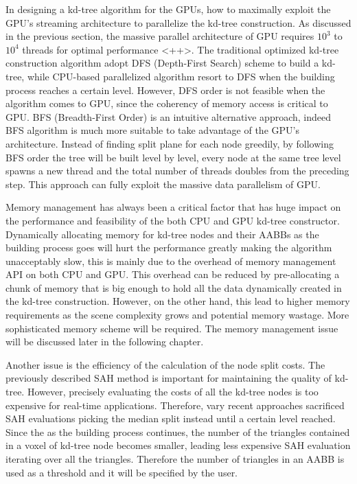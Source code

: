 In designing a kd-tree algorithm for the GPUs, how to maximally exploit the GPU's streaming architecture to parallelize the kd-tree construction. As discussed in the previous section, the massive parallel architecture of GPU requires \(10^{3}\) to \(10^{4}\) threads for optimal performance \cite{}<++>. The traditional optimized kd-tree construction algorithm adopt DFS (Depth-First Search) scheme to build a kd-tree, while CPU-based parallelized algorithm resort to DFS when the building process reaches a certain level. However, DFS order is not feasible when the algorithm comes to GPU, since the coherency of memory access is critical to GPU. BFS (Breadth-First Order) is an intuitive alternative approach, indeed BFS algorithm is much more suitable to take advantage of the GPU's architecture. Instead of finding split plane for each node greedily, by following BFS order the tree will be built level by level, every node at the same tree level spawns a new thread and the total number of threads doubles from the preceding step. This approach can fully exploit the massive data parallelism of GPU.

Memory management has always been a critical factor that has huge impact on the performance and feasibility of the both CPU and GPU kd-tree constructor. Dynamically allocating memory for kd-tree nodes and their AABBs as the building process goes will hurt the performance greatly making the algorithm unacceptably slow, this is mainly due to the overhead of memory management API on both CPU and GPU. This overhead can be reduced by pre-allocating a chunk of memory that is big enough to hold all the data dynamically created in the kd-tree construction. However, on the other hand, this lead to higher memory requirements as the scene complexity grows and potential memory wastage. More sophisticated memory scheme will be required. The memory management issue will be discussed later in the following chapter.

Another issue is the efficiency of the calculation of the node split costs. The previously described SAH method is important for maintaining the quality of kd-tree. However, precisely evaluating the costs of all the kd-tree nodes is too expensive for real-time applications. Therefore, vary recent approaches sacrificed SAH evaluations picking the median split instead until a certain level reached. Since the as the building process continues, the number of the triangles contained in a voxel of kd-tree node becomes smaller, leading less expensive SAH evaluation iterating over all the triangles. Therefore the number of triangles in an AABB is used as a threshold and it will be specified by the user. 

